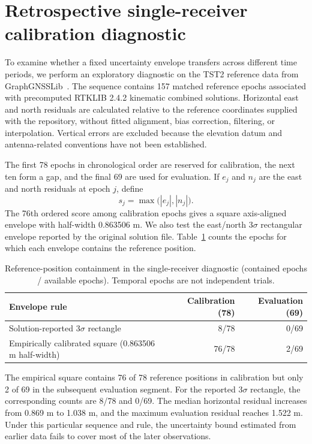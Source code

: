 \appendix
\section{Retrospective single-receiver calibration diagnostic}\label{app:receiver}
To examine whether a fixed uncertainty envelope transfers across different time periods, we perform an exploratory diagnostic on the TST2 reference data from GraphGNSSLib~\cite{GraphGNSSData}. The sequence contains 157 matched reference epochs associated with precomputed RTKLIB 2.4.2 kinematic combined solutions. Horizontal east and north residuals are calculated relative to the reference coordinates supplied with the repository, without fitted alignment, bias correction, filtering, or interpolation. Vertical errors are excluded because the elevation datum and antenna-related conventions have not been established.

The first 78 epochs in chronological order are reserved for calibration, the next ten form a gap, and the final 69 are used for evaluation. If $e_j$ and $n_j$ are the east and north residuals at epoch $j$, define
\[
s_j=\max\bigl(|e_j|,|n_j|\bigr).
\]
The 76th ordered score among calibration epochs gives a square axis-aligned envelope with half-width 0.863506 m. We also test the east/north $3\sigma$ rectangular envelope reported by the original solution file. Table~\ref{tab:receiver} counts the epochs for which each envelope contains the reference position.

\begin{table}[htbp]\centering\small
\caption{Reference-position containment in the single-receiver diagnostic (contained epochs / available epochs). Temporal epochs are not independent trials.}\label{tab:receiver}
\begin{tabular}{lrr}\toprule
Envelope rule&Calibration (78)&Evaluation (69)\\\midrule
Solution-reported $3\sigma$ rectangle&8/78&0/69\\
Empirically calibrated square (0.863506 m half-width)&76/78&2/69\\\bottomrule
\end{tabular}
\end{table}

The empirical square contains 76 of 78 reference positions in calibration but only 2 of 69 in the subsequent evaluation segment. For the reported $3\sigma$ rectangle, the corresponding counts are 8/78 and 0/69. The median horizontal residual increases from 0.869 m to 1.038 m, and the maximum evaluation residual reaches 1.522 m. Under this particular sequence and rule, the uncertainty bound estimated from earlier data fails to cover most of the later observations.

